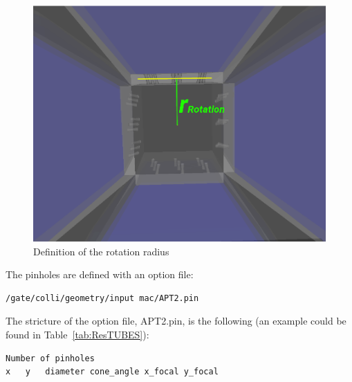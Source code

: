 \documentclass[12pt]{article}
\begin{document}
\begin{figure}[htp]
\centering
\includegraphics[scale=0.3]{figs/rot_radius.png}
\caption{Definition of the rotation radius}
\label{fig:rot_radius}
\end{figure}


The pinholes are defined with an option file:
\begin{verbatim}
/gate/colli/geometry/input mac/APT2.pin
\end{verbatim}

The stricture of the option file, APT2.pin, is the following (an example could be found in Table~\ref{tab:ResTUBES}):
\begin{verbatim}
Number of pinholes
x	y	diameter cone_angle	x_focal y_focal
\end{verbatim}
\end{document}
